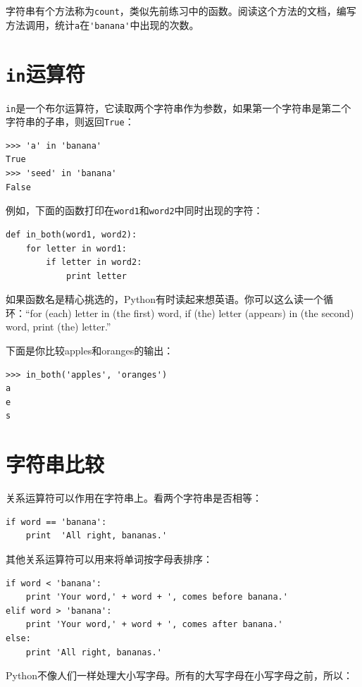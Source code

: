 \begin{ex}

字符串有个方法称为{\tt count}，类似先前练习中的函数。阅读这个方法的文档，编写方法调用，统计{\tt a}在\verb"'banana'"中出现的次数。
\end{ex}


\section{{\tt in}运算符}
\label{inboth}


{\tt in}是一个布尔运算符，它读取两个字符串作为参数，如果第一个字符串是第二个字符串的子串，则返回{\tt True}：

\beforeverb
\begin{verbatim}
>>> 'a' in 'banana'
True
>>> 'seed' in 'banana'
False
\end{verbatim}
\afterverb
%
例如，下面的函数打印在{\tt word1}和{\tt word2}中同时出现的字符：

\beforeverb
\begin{verbatim}
def in_both(word1, word2):
    for letter in word1:
        if letter in word2:
            print letter
\end{verbatim}
\afterverb
%
如果函数名是精心挑选的，Python有时读起来想英语。你可以这么读一个循环：“for (each) letter in (the first) word, if (the) letter (appears) in (the second) word, print (the) letter.”

下面是你比较apples和oranges的输出：

\beforeverb
\begin{verbatim}
>>> in_both('apples', 'oranges')
a
e
s
\end{verbatim}
\afterverb
%

\section{字符串比较}


关系运算符可以作用在字符串上。看两个字符串是否相等：

\beforeverb
\begin{verbatim}
if word == 'banana':
    print  'All right, bananas.'
\end{verbatim}
\afterverb
%
其他关系运算符可以用来将单词按字母表排序：

\beforeverb
\begin{verbatim}
if word < 'banana':
    print 'Your word,' + word + ', comes before banana.'
elif word > 'banana':
    print 'Your word,' + word + ', comes after banana.'
else:
    print 'All right, bananas.'
\end{verbatim}
\afterverb
%
Python不像人们一样处理大小写字母。所有的大写字母在小写字母之前，所以：

